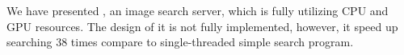 

We have presented \name{}, an image search server, which is fully utilizing CPU and GPU resources.
The design of it is not fully implemented, however, it speed up searching 38 times compare to single-threaded simple search program.

